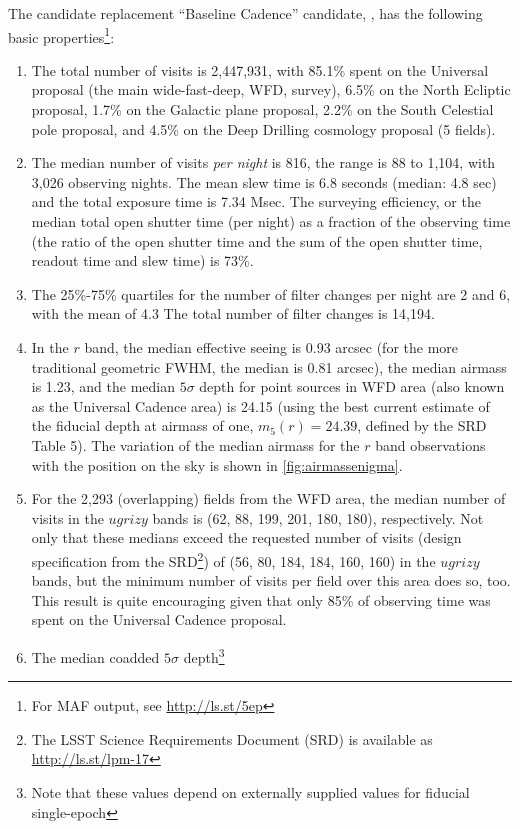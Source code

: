 The candidate replacement ``Baseline Cadence'' candidate,
, has the following basic
properties\footnote{For MAF output, see \url{http://ls.st/5ep}}:
\begin{enumerate}
\item The total number of visits is 2,447,931, with 85.1\% spent on
the Universal proposal (the main wide-fast-deep, WFD, survey), 6.5\% on the
North Ecliptic proposal, 1.7\% on the Galactic plane proposal, 2.2\%
on the South Celestial pole proposal, and 4.5\% on the Deep Drilling
cosmology proposal (5 fields).
\item The median number of visits {\it per night} is 816, the range is
88 to 1,104, with 3,026 observing nights. The mean slew time is 6.8
seconds (median: 4.8 sec) and the total exposure time is 7.34 Msec. 
The surveying efficiency, or the median total open shutter time (per night) 
as a fraction of the observing time (the ratio of the open shutter time and
the sum of the open shutter time, readout time and slew time) is 73\%. 
\item 
The 25\%-75\% quartiles for the number of filter changes per night are 2
and 6, with the mean of 4.3 The total number of filter changes is 14,194. 
\item In the $r$ band, the median effective seeing is 0.93 arcsec (for the more
traditional geometric FWHM, the median is 0.81 arcsec), the median
airmass is 1.23, and the median $5\sigma$ depth for point sources in WFD
area (also known as the Universal Cadence area) is 24.15 (using the best 
current estimate of the fiducial depth at airmass of one, $m_5(r)=24.39$, 
defined by the SRD Table 5). The variation of the median airmass for the $r$ 
band observations with the position on the sky is shown in
\autoref{fig:airmassenigma}.
\item For the 2,293 (overlapping) fields from the WFD area, 
the median number of visits in the $ugrizy$ bands is (62, 88, 199, 201, 180,
180), respectively. Not only that these medians exceed the requested
number of visits (design specification from the SRD\footnote{The LSST
Science Requirements Document (SRD) is available as
\url{http://ls.st/lpm-17}}) of (56, 80, 184, 184, 160, 160) in the $ugrizy$
bands, but the minimum number of visits per field over this area does
so, too. This result is quite encouraging given that 
only 85\% of observing time was spent on the Universal Cadence proposal. 
\item The median coadded $5\sigma$ depth\footnote{Note that these values
depend on externally supplied values for fiducial single-epoch
}
\end{enumerate}

